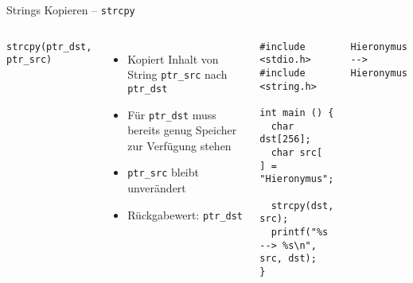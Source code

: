 \begin{frame}[fragile]{Strings Kopieren -- \texttt{strcpy}}
%
\begin{columns}[T]
\begin{codebox}[Syntax]
\footnotesize\texttt{strcpy(ptr\_dst, ptr\_src)}
\end{codebox}
%
\begin{itemize}
\item Kopiert Inhalt von String \texttt{ptr\_src} nach \texttt{ptr\_dst}
\item Für \texttt{ptr\_dst} muss bereits genug Speicher zur Verfügung stehen
\item \texttt{ptr\_src} bleibt unverändert
\item Rückgabewert: \texttt{ptr\_dst}
\end{itemize}
%
\begin{codebox}[Beispiel]
\begin{verbatim}
#include <stdio.h>
#include <string.h>

int main () {
  char dst[256];
  char src[   ] = "Hieronymus";

  strcpy(dst, src);
  printf("%s --> %s\n", src, dst);
}
\end{verbatim}
\end{codebox}
%
\begin{cmdbox}[Ausgabe]
\scriptsize\texttt{Hieronymus -{}-> Hieronymus}
\end{cmdbox}
%
\end{columns}
%
\end{frame}


